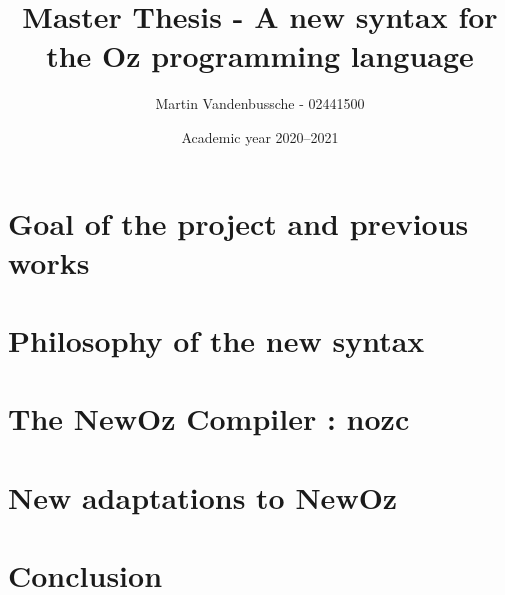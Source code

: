 \documentclass[a4paper,11pt]{scrreprt}
\title{Master Thesis - A new syntax for the Oz programming language}
\author{Martin Vandenbussche - 02441500}
\date{Academic year 2020--2021}
\begin{document}
\maketitle

\tableofcontents


\medskip

\chapter{Goal of the project and previous works}\label{ch:intro}


\chapter{Philosophy of the new syntax}\label{ch:1}


\chapter{The NewOz Compiler : nozc}\label{ch:2}


\chapter{New adaptations to NewOz}\label{ch:3}


\chapter{Conclusion}\label{ch:conclusion}


\begin{appendices}

\end{appendices}

\printbibliography
\end{document}
